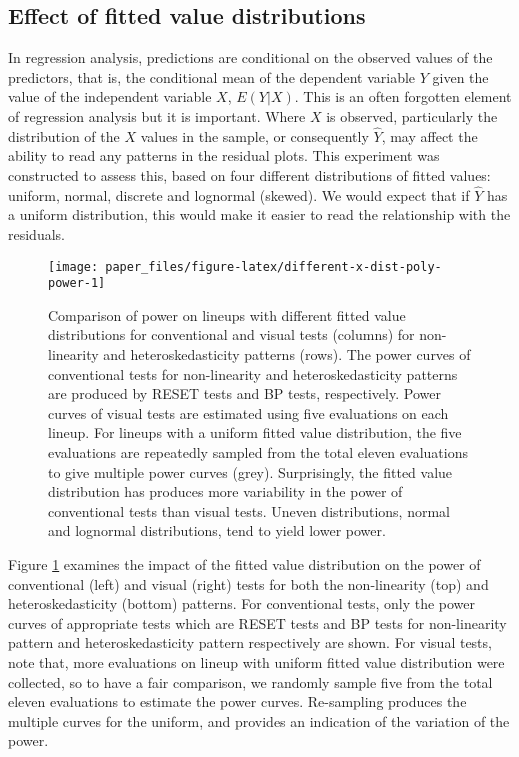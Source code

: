 \documentclass[]{interact}
\theoremstyle{plain}%
\theoremstyle{definition}
\theoremstyle{remark}
\begin{document}
\hypertarget{effect-of-fitted-value-distributions}{%
\subsection{Effect of fitted value
distributions}\label{effect-of-fitted-value-distributions}}

In regression analysis, predictions are conditional on the observed
values of the predictors, that is, the conditional mean of the dependent
variable \(Y\) given the value of the independent variable \(X\),
\(E(Y|X)\). This is an often forgotten element of regression analysis
but it is important. Where \(X\) is observed, particularly the
distribution of the \(X\) values in the sample, or consequently
\(\hat{Y}\), may affect the ability to read any patterns in the residual
plots. This experiment was constructed to assess this, based on four
different distributions of fitted values: uniform, normal, discrete and
lognormal (skewed). We would expect that if \(\hat{Y}\) has a uniform
distribution, this would make it easier to read the relationship with
the residuals.

\begin{figure}[t!]

{\centering \texttt{[image: paper\_files/figure-latex/different-x-dist-poly-power-1]} 

}

\caption{Comparison of power on lineups with different fitted value distributions for conventional and visual tests (columns) for non-linearity and heteroskedasticity patterns (rows). The power curves of conventional tests for non-linearity and heteroskedasticity patterns are produced by RESET tests and BP tests, respectively. Power curves of visual tests are estimated using five evaluations on each lineup. For lineups with a uniform fitted value distribution, the five evaluations are repeatedly sampled from the total eleven evaluations to give multiple power curves (grey). Surprisingly, the fitted value distribution has produces more variability in the power of conventional tests than visual tests. Uneven distributions, normal and lognormal distributions, tend to yield lower power.}\label{fig:different-x-dist-poly-power}
\end{figure}

Figure \ref{fig:different-x-dist-poly-power} examines the impact of the
fitted value distribution on the power of conventional (left) and visual
(right) tests for both the non-linearity (top) and heteroskedasticity
(bottom) patterns. For conventional tests, only the power curves of
appropriate tests which are RESET tests and BP tests for non-linearity
pattern and heteroskedasticity pattern respectively are shown. For
visual tests, note that, more evaluations on lineup with uniform fitted
value distribution were collected, so to have a fair comparison, we
randomly sample five from the total eleven evaluations to estimate the
power curves. Re-sampling produces the multiple curves for the uniform,
and provides an indication of the variation of the power.
\end{document}

